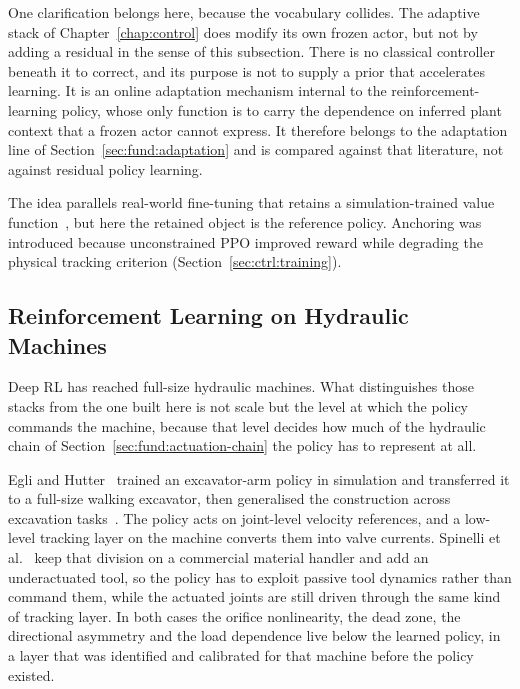 One clarification belongs here, because the vocabulary collides. The adaptive
stack of Chapter~\ref{chap:control} does modify its own frozen actor, but not by
adding a residual in the sense of this subsection. There is no classical
controller beneath it to correct, and its purpose is not to supply a prior that
accelerates learning. It is an online adaptation mechanism internal to the
reinforcement-learning policy, whose only function is to carry the dependence on
inferred plant context that a frozen actor cannot express. It therefore belongs
to the adaptation line of
Section~\ref{sec:fund:adaptation} and is compared against that literature, not
against residual policy learning.

The idea parallels real-world fine-tuning that retains a simulation-trained
value function~\cite{yin2025rapidly}, but here the retained object is the
reference policy. Anchoring was introduced because unconstrained PPO improved
reward while degrading the physical tracking criterion
(Section~\ref{sec:ctrl:training}).

\subsection{Reinforcement Learning on Hydraulic Machines}

Deep RL has reached full-size hydraulic machines. What distinguishes those
stacks from the one built here is not scale but the level at which the policy
commands the machine, because that level decides how much of the hydraulic
chain of Section~\ref{sec:fund:actuation-chain} the policy has to represent at
all.

Egli and Hutter~\cite{egli2020towards} trained an excavator-arm policy in
simulation and transferred it to a full-size walking excavator, then generalised
the construction across excavation tasks~\cite{egli2022general}. The policy
acts on joint-level velocity references, and a low-level tracking layer on the
machine converts them into valve currents. Spinelli et
al.~\cite{spinelli2024rl} keep that division on a commercial material handler
and add an underactuated tool, so the policy has to exploit passive tool
dynamics rather than command them, while the actuated joints are still driven
through the same kind of tracking layer. In both cases the orifice
nonlinearity, the dead zone, the directional asymmetry and the load dependence
live below the learned policy, in a layer that was identified and calibrated for
that machine before the policy existed.

